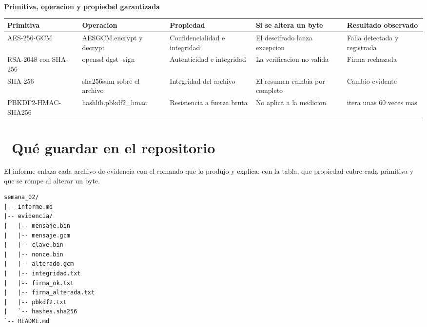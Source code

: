 \documentclass[11pt,a4paper]{article}
\newcommand{\iconotexto}[2]{\textcolor{cyanNeon}{\faIcon{#1}}~#2}
\begin{document}
\begin{center}
\begin{minipage}{\linewidth}
\centering
{\footnotesize
\textbf{Primitiva, operacion y propiedad garantizada}\par\smallskip
\begin{tabular}{@{}>{\raggedright\arraybackslash}p{2.60cm}>{\raggedright\arraybackslash}p{3.00cm}>{\raggedright\arraybackslash}p{3.00cm}>{\raggedright\arraybackslash}p{2.90cm}>{\raggedright\arraybackslash}p{3.00cm}@{}}
\toprule
\textbf{Primitiva} & \textbf{Operacion} & \textbf{Propiedad} & \textbf{Si se altera un byte} & \textbf{Resultado observado} \\
\midrule
AES-256-GCM & AESGCM.encrypt y decrypt & Confidencialidad e integridad & El descifrado lanza excepcion & Falla detectada y registrada \\
RSA-2048 con SHA-256 & openssl dgst -sign & Autenticidad e integridad & La verificacion no valida & Firma rechazada \\
SHA-256 & sha256sum sobre el archivo & Integridad del archivo & El resumen cambia por completo & Cambio evidente \\
PBKDF2-HMAC-SHA256 & hashlib.pbkdf2\_hmac & Resistencia a fuerza bruta & No aplica a la medicion & 600000 itera unas 60 veces mas \\
\bottomrule
\end{tabular}
}
\par{}
\end{minipage}
\end{center}

\section{\iconotexto{box-open}{Qué guardar en el repositorio}}

El informe enlaza cada archivo de evidencia con el comando que lo produjo y explica, con la tabla, que propiedad cubre cada primitiva y que se rompe al alterar un byte.

\begin{lstlisting}[style=estiloCodigo]
semana_02/
|-- informe.md
|-- evidencia/
|   |-- mensaje.bin
|   |-- mensaje.gcm
|   |-- clave.bin
|   |-- nonce.bin
|   |-- alterado.gcm
|   |-- integridad.txt
|   |-- firma_ok.txt
|   |-- firma_alterada.txt
|   |-- pbkdf2.txt
|   `-- hashes.sha256
`-- README.md
\end{lstlisting}
\end{document}
